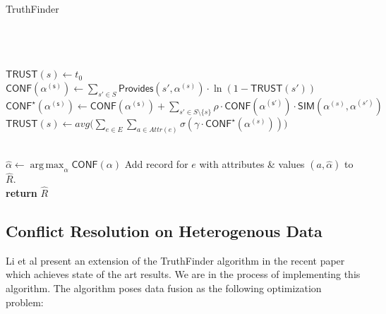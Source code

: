\documentclass{acm_proc_article-sp}
\DeclareMathOperator*{\argmax}{arg\,max}
\begin{document}
\begin{algorithm}
\caption{TruthFinder}
\begin{algorithmic}[1]
\small
{} \\
 \\
 \\

\State $\mathsf{TRUST}(s) \leftarrow t_0$
\EndFor
\\
\State $\mathsf{CONF(\alpha^{(s)})} \leftarrow \sum_{s' \in S} \mathsf{Provides}(s',\alpha^{(s)}) \cdot \ln(1-\mathsf{TRUST}(s'))$
\EndFor
{}
\State $\mathsf{CONF^\star(\alpha^{(s)})} \leftarrow \mathsf{CONF(\alpha^{(s)})} +   \sum_{s' \in S \setminus \{s\}} \rho \cdot \mathsf{CONF(\alpha^{(s')})}  \cdot \mathsf{SIM}(\alpha^{(s)},\alpha^{(s')})$
\EndFor
\EndFor
{}
\State $\mathsf{TRUST}(s) \leftarrow avg \big ( \sum_{e \in E}\sum_{a \in Attr(e)} \sigma(\gamma \cdot \mathsf{CONF}^\star(\alpha^{(s)})) \big )$
\EndFor
\EndWhile

\\

\State $\hat{\alpha} \leftarrow \argmax_{\alpha} \mathsf{CONF}(\alpha)$
\EndFor
\State Add record for $e$ with attributes \& values $(a, \hat{\alpha})$ to $\hat{R}$.
\EndFor
\\

\State \textbf{return} $\hat{R}$
\EndFunction
\end{algorithmic}
\label{alg:tf}
\end{algorithm}  

\subsection{Conflict Resolution on Heterogenous Data}

Li et al present an extension of the {\sc TruthFinder} algorithm in the recent paper \cite{li:resolving} which achieves state of the art results. We are in the process of implementing this algorithm. The algorithm poses data fusion as the following optimization problem: 
\end{document}
